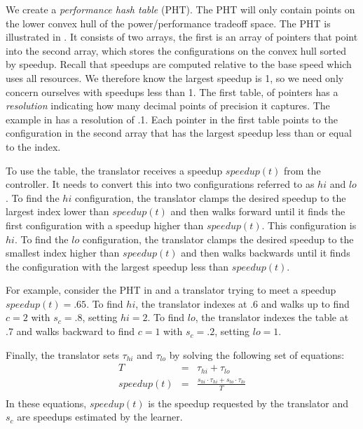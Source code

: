 We create a \emph{performance hash table} (PHT).  The PHT will only
contain points on the lower convex hull of the power/performance
tradeoff space.  The PHT is illustrated in .  It consists
of two arrays, the first is an array of pointers that point into the
second array, which stores the configurations on the convex hull
sorted by speedup.  Recall that speedups are computed relative to the
base speed which uses all resources.  We therefore know the largest
speedup is 1, so we need only concern ourselves with speedups less
than 1.  The first table, of pointers has a \emph{resolution}
indicating how many decimal points of precision it captures.  The
example in  has a resolution of .1.  Each pointer in the
first table points to the configuration in the second array that has
the largest speedup less than or equal to the index.

To use the table, the translator receives a speedup $speedup(t)$ from the
controller.  It needs to convert this into two configurations referred
to as $hi$ and $lo$.  To find the $hi$ configuration, the translator
clamps the desired speedup to the largest index lower than $speedup(t)$ and
then walks forward until it finds the first configuration with a
speedup higher than $speedup(t)$.  This configuration is $hi$.  To find the
$lo$ configuration, the translator clamps the desired speedup to the
smallest index higher than $speedup(t)$ and then walks backwards until it
finds the configuration with the largest speedup less than $speedup(t)$.

For example, consider the PHT in  and a translator trying
to meet a speedup $speedup(t) = .65$.  To find $hi$, the translator indexes
at .6 and walks up to find $c=2$ with $s_c=.8$, setting $hi = 2$.  To
find $lo$, the translator indexes the table at .7 and walks backward
to find $c=1$ with $s_c=.2$, setting $lo = 1$.

Finally, the translator sets $\tau_{hi}$ and $\tau_{lo}$ by solving the
following set of equations:
\begin{eqnarray}
  T &=& \tau_{hi} + \tau_{lo}    \label{eqn:s1} \\
  speedup(t) &=& \frac{s_{hi} \cdot \tau_{hi} + s_{lo} \cdot \tau_{lo}}{T} \label{eqn:s2} \\
  \label{eq:pht}
\end{eqnarray}
In these equations, $speedup(t)$ is the speedup requested by the translator
and $s_c$ are speedups estimated by the learner.

